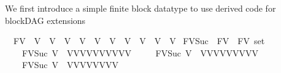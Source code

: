 \begin{isabellebody}
\isadelimdocument
%
\endisadelimdocument
%
\isatagdocument
%
\isamarkuptrue%
%
\endisatagdocument
{\isafolddocument}%
%
\isadelimdocument
%
\endisadelimdocument
%
\begin{isamarkuptext}%
We first introduce a simple finite block datatype to use derived code for blockDAG extensions%
\end{isamarkuptext}\isamarkuptrue%
\isamarkupfalse%
\ \ FV\ {\isacharequal}{\kern0pt}\ V{}\ {\isacharbar}{\kern0pt}\ V{}\ {\isacharbar}{\kern0pt}\ V{}\ {\isacharbar}{\kern0pt}\ V{}\ {\isacharbar}{\kern0pt}\ V{}\ {\isacharbar}{\kern0pt}\ V{}\ {\isacharbar}{\kern0pt}\ V{}\ {\isacharbar}{\kern0pt}\ V{}\ {\isacharbar}{\kern0pt}\ V{}\ {\isacharbar}{\kern0pt}\ V{}{}\isanewline
\isanewline
{}\isamarkupfalse%
\ FV{\isacharunderscore}{\kern0pt}Suc\ {\isacharcolon}{\kern0pt}{\isacharcolon}{\kern0pt}{\isachardoublequoteopen}\ FV\ {\isasymRightarrow}\ FV\ set{\isachardoublequoteclose}\ \isanewline
\ \ \ \isanewline
\ \ \ \ {\isachardoublequoteopen}FV{\isacharunderscore}{\kern0pt}Suc\ V{}\ {\isacharequal}{\kern0pt}\ {\isacharbraceleft}{\kern0pt}V{}{\isacharcomma}{\kern0pt}V{}{\isacharcomma}{\kern0pt}V{}{\isacharcomma}{\kern0pt}V{}{\isacharcomma}{\kern0pt}V{}{\isacharcomma}{\kern0pt}V{}{\isacharcomma}{\kern0pt}V{}{\isacharcomma}{\kern0pt}V{}{\isacharcomma}{\kern0pt}V{}{\isacharcomma}{\kern0pt}V{}{}{\isacharbraceright}{\kern0pt}{\isachardoublequoteclose}\ {\isacharbar}{\kern0pt}\isanewline
\ \ \ \ {\isachardoublequoteopen}FV{\isacharunderscore}{\kern0pt}Suc\ V{}\ {\isacharequal}{\kern0pt}\ {\isacharbraceleft}{\kern0pt}V{}{\isacharcomma}{\kern0pt}V{}{\isacharcomma}{\kern0pt}V{}{\isacharcomma}{\kern0pt}V{}{\isacharcomma}{\kern0pt}V{}{\isacharcomma}{\kern0pt}V{}{\isacharcomma}{\kern0pt}V{}{\isacharcomma}{\kern0pt}V{}{\isacharcomma}{\kern0pt}V{}{}{\isacharbraceright}{\kern0pt}{\isachardoublequoteclose}\ {\isacharbar}{\kern0pt}\isanewline
\ \ \ \ {\isachardoublequoteopen}FV{\isacharunderscore}{\kern0pt}Suc\ V{}\ {\isacharequal}{\kern0pt}\ {\isacharbraceleft}{\kern0pt}V{}{\isacharcomma}{\kern0pt}V{}{\isacharcomma}{\kern0pt}V{}{\isacharcomma}{\kern0pt}V{}{\isacharcomma}{\kern0pt}V{}{\isacharcomma}{\kern0pt}V{}{\isacharcomma}{\kern0pt}V{}{\isacharcomma}{\kern0pt}V{}{}{\isacharbraceright}{\kern0pt}{\isachardoublequoteclose}\ {\isacharbar}{\kern0pt}\isanewline

\end{isabellebody}
